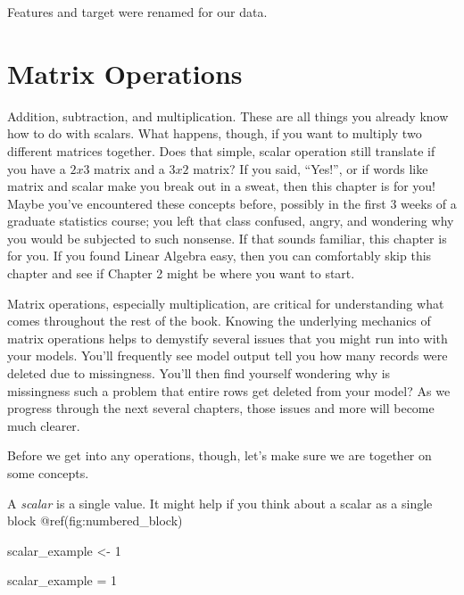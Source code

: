 \documentclass[
  letterpaper,
]{krantz}
\newenvironment{Shaded}{}{}
\newcommand{\DecValTok}[1]{\textcolor[rgb]{0.25,0.63,0.44}{#1}}
\newcommand{\NormalTok}[1]{#1}
\newcommand{\OperatorTok}[1]{\textcolor[rgb]{0.40,0.40,0.40}{#1}}
\newcommand{\OtherTok}[1]{\textcolor[rgb]{0.00,0.44,0.13}{#1}}
\begin{document}
Features and target were renamed for our data.

\chapter{Matrix Operations}\label{matrix-operations}

Addition, subtraction, and multiplication. These are all things you
already know how to do with scalars. What happens, though, if you want
to multiply two different matrices together. Does that simple, scalar
operation still translate if you have a \(2x3\) matrix and a \(3x2\)
matrix? If you said, ``Yes!'', or if words like matrix and scalar make
you break out in a sweat, then this chapter is for you! Maybe you've
encountered these concepts before, possibly in the first 3 weeks of a
graduate statistics course; you left that class confused, angry, and
wondering why you would be subjected to such nonsense. If that sounds
familiar, this chapter is for you. If you found Linear Algebra easy,
then you can comfortably skip this chapter and see if Chapter 2 might be
where you want to start.

Matrix operations, especially multiplication, are critical for
understanding what comes throughout the rest of the book. Knowing the
underlying mechanics of matrix operations helps to demystify several
issues that you might run into with your models. You'll frequently see
model output tell you how many records were deleted due to missingness.
You'll then find yourself wondering why is missingness such a problem
that entire rows get deleted from your model? As we progress through the
next several chapters, those issues and more will become much clearer.

Before we get into any operations, though, let's make sure we are
together on some concepts.

A \emph{scalar} is a single value. It might help if you think about a
scalar as a single block @ref(fig:numbered\_block)

\begin{Shaded}
\begin{Highlighting}[]
\NormalTok{scalar\_example }\OtherTok{\textless{}{-}} \DecValTok{1}
\end{Highlighting}
\end{Shaded}

\begin{Shaded}
\begin{Highlighting}[]
\NormalTok{scalar\_example }\OperatorTok{=} \DecValTok{1}
\end{Highlighting}
\end{Shaded}
\end{document}
